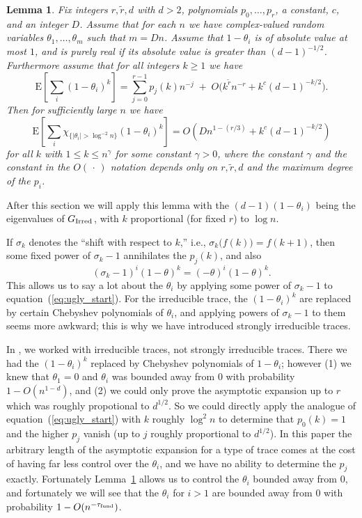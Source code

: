 \documentclass[12pt]{article}
\newtheorem{lemma}[theorem]{Lemma}
\newcommand{\fund}{{\rm fund}}
\newcommand{\taufund}{{\tau_\fund}}
\newcommand{\E}[1]{\mbox{E}\left[#1\right] }
\newcommand{\ird}[1]{{\rm Irred}_{#1}}
\begin{document}
\begin{lemma}\label{lm:ugly}
Fix integers $r,\widetilde r,d$ with $d>2$,
polynomials $p_0,\ldots,p_r$, a constant, $c$, and
an integer $D$.  
Assume that for each $n$ we have complex-valued random variables
$\theta_1,\ldots,\theta_m$ such that $m=Dn$.
Assume that $1-\theta_i$ is of absolute value at most $1$, and
is purely real if its absolute value is greater than $(d-1)^{-1/2}$.
Furthermore assume
that for all integers $k\ge 1$ we have
\begin{equation}\label{eq:ugly_start}
\E{ \sum_i (1-\theta_i)^k } = \sum_{j=0}^{r-1} p_j(k)n^{-j} \; + \;
O\bigl(k^{\widetilde r}n^{-r} + k^c (d-1)^{-k/2}\bigr).
\end{equation}
Then for sufficiently large $n$ we have
\begin{equation}\label{eq:ugly_finish}
\E{ \sum_i \chi_{\{|\theta_i|>\log^{-2}n\}} (1-\theta_i)^k }
= O(Dn^{1-(r/3)}+k^c(d-1)^{-k/2})
\end{equation}
for all $k$ with $1\le k\le n^\gamma$ for some constant $\gamma>0$, where the
constant $\gamma$ and the constant in the $O(\,\cdot\,)$ notation depends
only on $r,\widetilde r,d$ and the maximum degree of the $p_i$.
\end{lemma}

After this section we will apply this lemma with the $(d-1)(1-\theta_i)$
being the eigenvalues of $G_{\ird{}}$,
with $k$ proportional (for fixed $r$) to $\log n$.


If $\sigma_k$ denotes the ``shift with respect to $k$,'' i.e., 
$\sigma_k\bigl( f(k) \bigr) = f(k+1)$, then some fixed power of 
$\sigma_k-1$ annihilates the $p_j(k)$, and also
$$
(\sigma_k-1)^i (1-\theta)^k = (-\theta)^i (1-\theta)^k.
$$
This allows us to say a lot about the $\theta_i$ by applying some power
of $\sigma_k-1$ to equation~(\ref{eq:ugly_start}).
For the irreducible trace, the $(1-\theta_i)^k$ are replaced by certain
Chebyshev polynomials of $\theta_i$, and applying powers of $\sigma_k-1$
to them seems more awkward; this is why we have introduced strongly
irreducible traces.

In \cite{friedman_random_graphs}, we worked with irreducible traces, not
strongly irreducible traces.  There we had the $(1-\theta_i)^k$ replaced
by Chebyshev polynomials of $1-\theta_i$; however (1) we knew that
$\theta_1=0$ and $\theta_i$ was bounded away from $0$ with probability
$1-O(n^{1-d})$, and (2) we could only prove the asymptotic expansion up to
$r$ which was roughly propotional to $d^{1/2}$.  So we could directly
apply the analogue of equation~(\ref{eq:ugly_start}) with $k$ roughly
$\log^2 n$ to determine that $p_0(k)=1$ and the higher $p_j$ vanish
(up to $j$ roughly proportional to $d^{1/2}$).  In this paper the
arbitrary length of the asymptotic expansion for a type of trace comes
at the cost of having far less control over the $\theta_i$, and we have
no ability to determine the $p_j$ exactly.  Fortunately
Lemma~\ref{lm:ugly} allows us to control the $\theta_i$ bounded away
from $0$, and fortunately we will see that
the $\theta_i$ for $i>1$ are bounded away
from $0$ with probability $1-O(n^{-\taufund})$.
\end{document}
